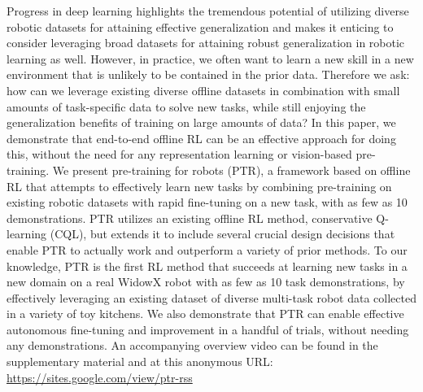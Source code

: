 \documentclass[../thesis.tex]{subfiles}
\begin{document}

Progress in deep learning highlights the tremendous potential of utilizing diverse robotic datasets for attaining effective generalization and makes it enticing to consider leveraging broad datasets for attaining robust generalization in robotic learning as well. However, in practice, we often want to learn a new skill in a new environment that is unlikely to be contained in the prior data. Therefore we ask: how can we leverage existing diverse offline datasets in combination with small amounts of task-specific data to solve new tasks, while still enjoying the generalization benefits of training on large amounts of data? In this paper, we demonstrate that end-to-end offline RL can be an effective approach for doing this, without the need for any representation learning or vision-based pre-training. We present pre-training for robots (PTR), a framework based on offline RL that attempts to effectively learn new tasks by combining pre-training on existing robotic datasets with rapid fine-tuning on a new task, with as few as 10 demonstrations. PTR utilizes an existing offline RL method, conservative Q-learning (CQL), but extends it to include several crucial design decisions that enable PTR to actually work and outperform a variety of prior methods. To our knowledge, PTR is the first RL method that succeeds at learning new tasks in a new domain on a real WidowX robot with as few as 10 task demonstrations, by effectively leveraging an existing dataset of diverse multi-task robot data collected in a variety of toy kitchens. We also demonstrate that PTR can enable effective autonomous fine-tuning and improvement in a handful of trials, without needing any demonstrations. An accompanying overview video can be found in the supplementary material and at this anonymous URL: \url{https://sites.google.com/view/ptr-rss}






	




\end{document}
